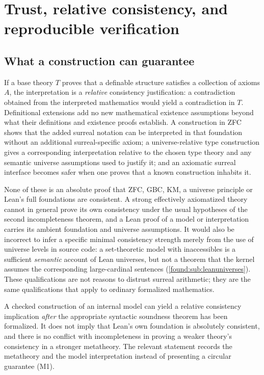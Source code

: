 \documentclass[11pt,letterpaper]{article}
\numberwithin{equation}{section}
\theoremstyle{definition}
\theoremstyle{remark}
\begin{document}
\section{Trust, relative consistency, and reproducible verification}
\label{found:sec:trust}

\subsection{What a construction can guarantee}
\label{found:sub:relativeconsistency}
If a base theory $T$ proves that a definable structure satisfies a collection of
axioms $A$, the interpretation is a \emph{relative} consistency justification: a
contradiction obtained from the interpreted mathematics would yield a
contradiction in $T$. Definitional extensions add no new mathematical existence
assumptions beyond what their definitions and existence proofs establish. A
construction in ZFC shows that the added surreal notation can be interpreted in
that foundation without an additional surreal-specific axiom; a universe-relative
type construction gives a corresponding interpretation relative to the chosen
type theory and any semantic universe assumptions used to justify it; and an
axiomatic surreal interface becomes safer when one proves that a known
construction inhabits it.

None of these is an absolute proof that ZFC, GBC, KM, a universe principle or
Lean's full foundations are consistent. A strong effectively axiomatized theory
cannot in general prove its own consistency under the usual hypotheses of the
second incompleteness theorem, and a Lean proof of a model or interpretation
carries its ambient foundation and universe assumptions. It would also be
incorrect to infer a specific minimal consistency strength merely from the use of
universe levels in source code: a set-theoretic model with inaccessibles is a
sufficient \emph{semantic} account of Lean universes, but not a theorem that the
kernel assumes the corresponding large-cardinal sentences
(\cref{found:sub:leanuniverses}). These qualifications are not reasons to
distrust surreal arithmetic; they are the same qualifications that apply to
ordinary formalized mathematics.

A checked construction of an internal model can yield a relative consistency
implication \emph{after} the appropriate syntactic soundness theorem has been
formalized. It does not imply that Lean's own foundation is absolutely
consistent, and there is no conflict with incompleteness in proving a weaker
theory's consistency in a stronger metatheory. The relevant statement records
the metatheory and the model interpretation instead of presenting a circular
guarantee (M1).
\end{document}
